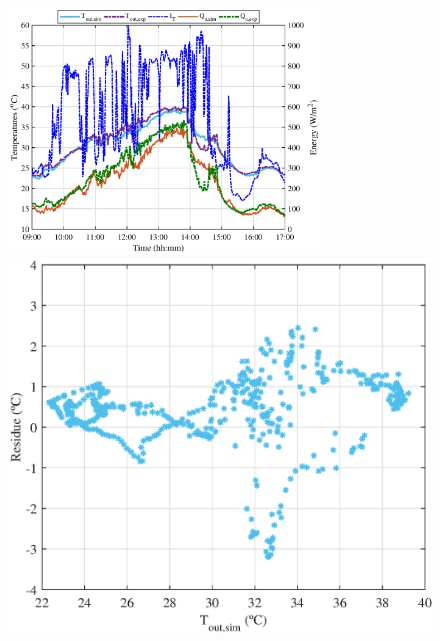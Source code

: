 \begin{figure}[ht!]
\begin{minipage}{0.60\columnwidth}
		\includegraphics[width=0.99\columnwidth,height=65mm]{figs/009-3.eps}
	\end{minipage}
	\begin{minipage}{0.39\columnwidth}
		\includegraphics[scale=0.5,width=1.0\columnwidth]{figs/009-residue-5.eps}

\end{minipage}
\end{figure}
